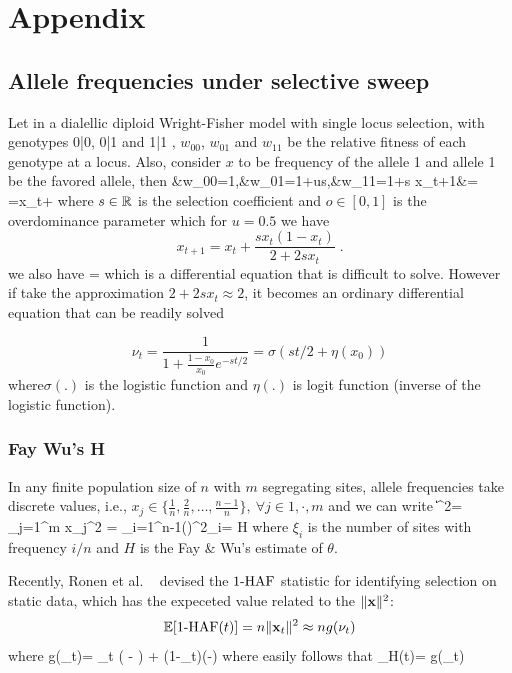 \documentclass[11pt]{article}
\begin{document}
\newpage
\section{Appendix}
\subsection{Allele frequencies under selective sweep} \label{app:af}
Let in a dialellic diploid Wright-Fisher model with single locus selection, 
with genotypes 0|0, 0|1 and 1|1 , $w_{00}$, $w_{01}$ and  $w_{11}$ be the 
relative fitness of each genotype at a locus. Also, consider $x$ to be 
frequency of the allele 1 and allele 1 be the favored allele, then
\beq
&w_{00}=1,&w_{01}=1+us,&w_{11}=1+s
\eeq
\beq
x_{t+1}&= =x_t+ 
\eeq
where $s\in {\mathbb R}$ is the selection coefficient and $o\in[0,1]$ is the 
overdominance parameter which for $u=0.5$ we have
\begin{equation}
x_{t+1}=x_t+\frac{sx_t(1-x_t)}{2+2sx_t}\;.
\label{eq:transition}
\end{equation}
we also have
\beq
{} = 
\eeq
which is a differential equation that is difficult to solve. However if take 
the approximation $2+2sx_t \approx 2$, it becomes an ordinary differential 
equation that can be readily solved

\begin{equation}
\nu_t =\frac{1}{1+\frac{1-x_0}{x_0}e^{-st/2}} = \sigma(st/2+\eta(x_0)) 
\label{eq:inf-pop}
\end{equation}
where$\sigma(.)$ is the logistic
function and $\eta(.)$ is logit function (inverse of the logistic function). 

\subsubsection{Fay Wu's H}\label{app:h}
\bl
In any finite population size of $n$ with $m$ segregating sites, 
allele frequencies take 
discrete values, i.e.,  $x_j \in 
\{\frac{1}{n},\frac{2}{n},\ldots,\frac{n-1}{n}\}, \ \forall j \in{1,\cdot,m}$ 
and we can write
\beq
\|\bfx\|^2= \sum_{j=1}^{m} x_j^2 = 
\sum_{i=1}^{n-1}\left(\right)^2\xi_i= 
H 
\eeq
where $\xi_i$ is the number of sites with frequency $i/n$ and $H$ is the 
Fay \& Wu's estimate of $\theta$.
\el

Recently, Ronen et al. ~\cite{ronen2015predicting} devised the $1\text{-HAF}$ 
statistic for identifying selection on static data, which has the expeceted 
value related to the $\|{\mathbf x}\|^2$:
\begin{equation} 
{\mathbb E}[1\text{-HAF}(t)]= n\| {\mathbf x}_t\|^2\approx ng(\nu_t)
\end{equation} 
where
\beq
g(\nu_t)= \theta \nu_t \left( - \right) +
\theta (1-\nu_t)\left(-\right)
\label{eq:hafscorepooled}
\eeq
where easily follows that
\beq
\theta_H(t)= g(\nu_t)
\eeq
\end{document}
